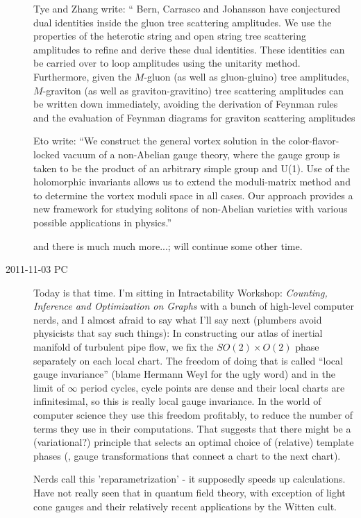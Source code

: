 \begin{description}
Tye and Zhang write: ``
Bern, Carrasco and Johansson have conjectured dual
   identities inside the gluon tree scattering amplitudes.
   We use the properties of the heterotic string and open string tree
   scattering amplitudes to refine and derive these dual identities.
   These identities can be carried over to loop amplitudes using the
   unitarity method. Furthermore, given the $M$-gluon (as well as
   gluon-gluino) tree amplitudes, $M$-graviton (as well as
   graviton-gravitino) tree scattering amplitudes can be written down
   immediately, avoiding the derivation of Feynman rules and the
   evaluation of Feynman diagrams for graviton scattering amplitudes

Eto \etal{} write:
   ``We construct the general vortex solution in the color-flavor-locked
   vacuum of a non-Abelian gauge theory, where the gauge group is taken
   to be the product of an arbitrary simple group and U(1). Use of the
   holomorphic invariants allows us to extend the moduli-matrix method
   and to determine the vortex moduli space in all cases. Our approach
   provides a new framework for studying solitons of non-Abelian
   varieties with various possible applications in physics.''

and there is much much more...; will continue some other time.

\item[2011-11-03 PC] Today is that time. I'm sitting in
     {Intractability Workshop:}
     \emph{Counting, Inference and Optimization on Graphs}
with a bunch of high-level computer nerds, and I almost afraid to say
what I'll say next (plumbers avoid physicists that say such things): In
constructing our atlas of inertial manifold of turbulent pipe flow, we
fix the $SO(2) \times O(2)$ phase separately on each local chart. The
freedom of doing that is called ``local gauge invariance'' (blame Hermann
Weyl for the ugly word) and in the limit of $\infty$ period cycles, cycle
points are dense and their local charts are infinitesimal, so this is
really local gauge invariance. In the world of computer science they use
this freedom profitably, to reduce the number of terms they use in their
computations. That suggests that there might be a (variational?)
principle that selects an optimal choice of (relative) template phases
(\ie, gauge transformations that connect a chart to the next chart).

Nerds call this 'reparametrization' - it supposedly speeds up calculations.
Have not really seen that in quantum field theory, with exception of light
cone gauges and their relatively recent applications by the Witten cult.


\end{description}

